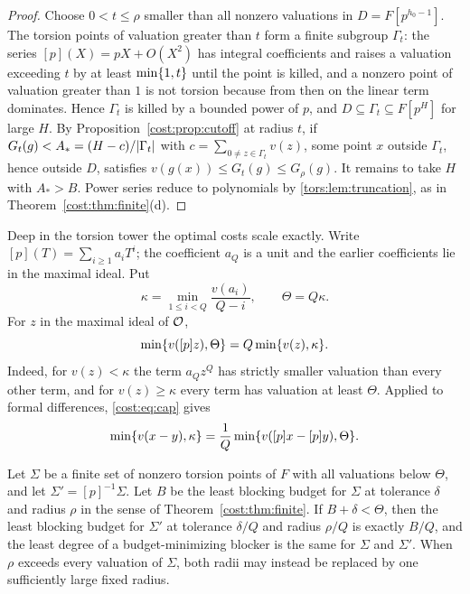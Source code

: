 \begin{proof}
Choose $0<t\le\rho$ smaller than all nonzero valuations in $D=F[p^{h_0-1}]$. The torsion
points of valuation greater than $t$ form a finite subgroup $\Gamma_t$: the series
$[p](X)=pX+O(X^2)$ has integral coefficients and raises a valuation exceeding $t$ by at
least $\min\{1,t\}$ until the point is killed, and a nonzero point of valuation greater
than $1$ is not torsion because from then on the linear term dominates. Hence $\Gamma_t$ is
killed by a bounded power of $p$, and $D\subseteq\Gamma_t\subseteq F[p^H]$ for large $H$.
By Proposition~\ref{cost:prop:cutoff} at radius $t$, if $G_t(g)<A_*=(H-c)/\lvert\Gamma_t\rvert$ with
$c=\sum_{0\ne z\in\Gamma_t}v(z)$, some point $x$ outside $\Gamma_t$, hence outside $D$,
satisfies $v(g(x))\le G_t(g)\le G_\rho(g)$. It remains to take $H$ with $A_*>B$. Power series
reduce to polynomials by \cref{tors:lem:truncation}, as in Theorem~\ref{cost:thm:finite}(d).
\end{proof}

Deep in the torsion tower the optimal costs scale exactly. Write
$[p](T)=\sum_{i\ge1}a_iT^i$; the coefficient $a_Q$ is a unit and the earlier coefficients
lie in the maximal ideal. Put
\[
 \kappa=\min_{1\le i<Q}\frac{v(a_i)}{Q-i},\qquad\Theta=Q\kappa.
\]
For $z$ in the maximal ideal of $\mathcal{O}$,
\begin{equation}\label{cost:eq:cap}
 \min\{v([p]z),\Theta\}=Q\min\{v(z),\kappa\}.
\end{equation}
Indeed, for $v(z)<\kappa$ the term $a_Qz^Q$ has strictly smaller valuation than every other
term, and for $v(z)\ge\kappa$ every term has valuation at least $\Theta$. Applied to formal
differences, \eqref{cost:eq:cap} gives
\begin{equation}\label{cost:eq:capdiff}
 \min\{v(x-y),\kappa\}=\frac1Q\min\{v([p]x-[p]y),\Theta\}.
\end{equation}

\begin{proposition}\label{cost:prop:scaling}
Let $\Sigma$ be a finite set of nonzero torsion points of $F$ with all valuations below
$\Theta$, and let $\Sigma'=[p]^{-1}\Sigma$. Let $B$ be the least blocking budget for $\Sigma$
at tolerance $\delta$ and radius $\rho$ in the sense of Theorem~\ref{cost:thm:finite}. If
$B+\delta<\Theta$, then the least blocking budget for $\Sigma'$ at tolerance $\delta/Q$ and
radius $\rho/Q$ is exactly $B/Q$, and the least degree of a budget-minimizing blocker is the
same for $\Sigma$ and $\Sigma'$. When $\rho$ exceeds every valuation of $\Sigma$, both radii
may instead be replaced by one sufficiently large fixed radius.
\end{proposition}

